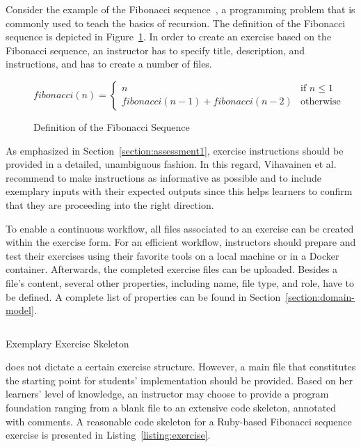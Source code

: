 Consider the example of the Fibonacci sequence~\cite{koshy2011fibonacci}, a programming problem that is commonly used to teach the basics of recursion. The definition of the Fibonacci sequence is depicted in Figure~\ref{figure:fibonacci-sequence}. In order to create an exercise based on the Fibonacci sequence, an instructor has to specify title, description, and instructions, and has to create a number of files.

\begin{figure}
\begin{equation}
fibonacci(n) =
\begin{cases}
n & \text{if } n \leq 1 \\
fibonacci(n - 1) + fibonacci(n - 2) & \text{otherwise}
\end{cases}
\end{equation}
\caption{Definition of the Fibonacci Sequence}
\label{figure:fibonacci-sequence}
\end{figure}

As emphasized in Section~\ref{section:assessment1}, exercise instructions should be provided in a detailed, unambiguous fashion. In this regard, Vihavainen et al.~\cite{vihavainen2012multi} recommend to make instructions as informative as possible and to include exemplary inputs with their expected outputs since this helps learners to confirm that they are proceeding into the right direction.

To enable a continuous workflow, all files associated to an exercise can be created within the exercise form. For an efficient workflow, instructors should prepare and test their exercises using their favorite tools on a local machine or in a Docker container. Afterwards, the completed exercise files can be uploaded. Besides a file's content, several other properties, including name, file type, and role, have to be defined. A complete list of properties can be found in Section~\ref{section:domain-model}.

\begin{listing}
\inputminted[frame=lines]{rb}{listings/exercise.rb}
\vspace{-0.33cm}
\caption{Exemplary Exercise Skeleton}
\label{listing:exercise}
\end{listing}

\tool does not dictate a certain exercise structure. However, a main file that constitutes the starting point for students' implementation should be provided. Based on her learners' level of knowledge, an instructor may choose to provide a program foundation ranging from a blank file to an extensive code skeleton, annotated with comments. A reasonable code skeleton for a Ruby-based Fibonacci sequence exercise is presented in Listing~\ref{listing:exercise}.

